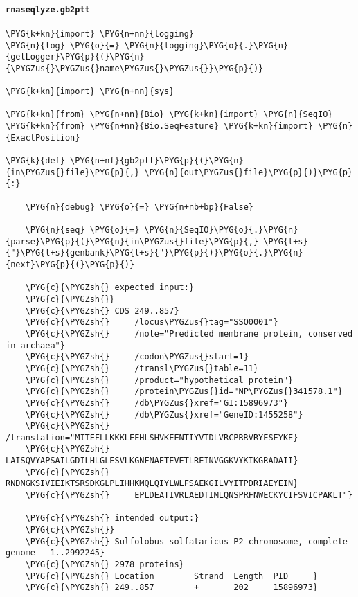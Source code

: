 \paragraph{\texttt{rnaseqlyze.gb2ptt}}
\label{index-pdf4:rnaseqlyze-gb2ptt}
\begin{Verbatim}[commandchars=\\\{\}]
\PYG{k+kn}{import} \PYG{n+nn}{logging}
\PYG{n}{log} \PYG{o}{=} \PYG{n}{logging}\PYG{o}{.}\PYG{n}{getLogger}\PYG{p}{(}\PYG{n}{\PYGZus{}\PYGZus{}name\PYGZus{}\PYGZus{}}\PYG{p}{)}

\PYG{k+kn}{import} \PYG{n+nn}{sys}

\PYG{k+kn}{from} \PYG{n+nn}{Bio} \PYG{k+kn}{import} \PYG{n}{SeqIO}
\PYG{k+kn}{from} \PYG{n+nn}{Bio.SeqFeature} \PYG{k+kn}{import} \PYG{n}{ExactPosition}

\PYG{k}{def} \PYG{n+nf}{gb2ptt}\PYG{p}{(}\PYG{n}{in\PYGZus{}file}\PYG{p}{,} \PYG{n}{out\PYGZus{}file}\PYG{p}{)}\PYG{p}{:}

    \PYG{n}{debug} \PYG{o}{=} \PYG{n+nb+bp}{False}

    \PYG{n}{seq} \PYG{o}{=} \PYG{n}{SeqIO}\PYG{o}{.}\PYG{n}{parse}\PYG{p}{(}\PYG{n}{in\PYGZus{}file}\PYG{p}{,} \PYG{l+s}{"}\PYG{l+s}{genbank}\PYG{l+s}{"}\PYG{p}{)}\PYG{o}{.}\PYG{n}{next}\PYG{p}{(}\PYG{p}{)}

    \PYG{c}{\PYGZsh{} expected input:}
    \PYG{c}{\PYGZsh{}}
    \PYG{c}{\PYGZsh{} CDS 249..857}
    \PYG{c}{\PYGZsh{}     /locus\PYGZus{}tag="SSO0001"}
    \PYG{c}{\PYGZsh{}     /note="Predicted membrane protein, conserved in archaea"}
    \PYG{c}{\PYGZsh{}     /codon\PYGZus{}start=1}
    \PYG{c}{\PYGZsh{}     /transl\PYGZus{}table=11}
    \PYG{c}{\PYGZsh{}     /product="hypothetical protein"}
    \PYG{c}{\PYGZsh{}     /protein\PYGZus{}id="NP\PYGZus{}341578.1"}
    \PYG{c}{\PYGZsh{}     /db\PYGZus{}xref="GI:15896973"}
    \PYG{c}{\PYGZsh{}     /db\PYGZus{}xref="GeneID:1455258"}
    \PYG{c}{\PYGZsh{}     /translation="MITEFLLKKKLEEHLSHVKEENTIYVTDLVRCPRRVRYESEYKE}
    \PYG{c}{\PYGZsh{}     LAISQVYAPSAILGDILHLGLESVLKGNFNAETEVETLREINVGGKVYKIKGRADAII}
    \PYG{c}{\PYGZsh{}     RNDNGKSIVIEIKTSRSDKGLPLIHHKMQLQIYLWLFSAEKGILVYITPDRIAEYEIN}
    \PYG{c}{\PYGZsh{}     EPLDEATIVRLAEDTIMLQNSPRFNWECKYCIFSVICPAKLT"}

    \PYG{c}{\PYGZsh{} intended output:}
    \PYG{c}{\PYGZsh{}}
    \PYG{c}{\PYGZsh{} Sulfolobus solfataricus P2 chromosome, complete genome - 1..2992245}
    \PYG{c}{\PYGZsh{} 2978 proteins}
    \PYG{c}{\PYGZsh{} Location        Strand  Length  PID     }
    \PYG{c}{\PYGZsh{} 249..857        +       202     15896973}


\end{Verbatim}

